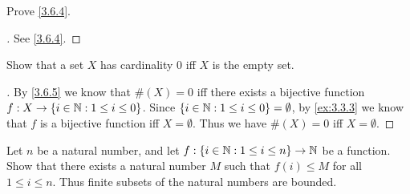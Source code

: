 \exercisesection

\begin{ex}\label{ex:3.6.1}
	Prove \cref{3.6.4}.
\end{ex}

\begin{proof}[]
	See \cref{3.6.4}.
\end{proof}

\begin{ex}\label{ex:3.6.2}
	Show that a set \(X\) has cardinality \(0\) iff \(X\) is the empty set.
\end{ex}

\begin{proof}[]
	By \cref{3.6.5} we know that \(\#(X) = 0\) iff there exists a bijective function \(f : X \to \left\lbrace i \in \mathbb{N} : 1 \leq i \leq 0\right\rbrace\).
	Since \(\left\lbrace i \in \mathbb{N} : 1 \leq i \leq 0\right\rbrace = \emptyset\), by \cref{ex:3.3.3} we know that \(f\) is a bijective function iff \(X = \emptyset\).
	Thus we have \(\#(X) = 0\) iff \(X = \emptyset\).
\end{proof}

\begin{ex}\label{ex:3.6.3}
	Let \(n\) be a natural number, and let \(f : \left\lbrace i \in \mathbb{N} : 1 \leq i \leq n\right\rbrace \to \mathbb{N}\) be a function.
	Show that there exists a natural number \(M\) such that \(f(i) \leq M\) for all \(1 \leq i \leq n\).
	Thus finite subsets of the natural numbers are bounded.
\end{ex}

